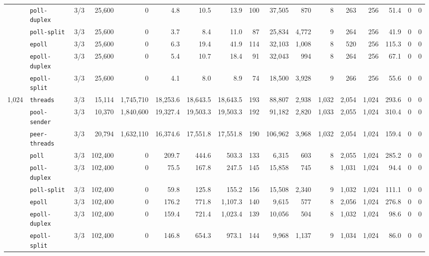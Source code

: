 \begin{longtable}{@{}llrrrrrrrrrrrrrrr@{}}
 & \texttt{poll-duplex} & 3/3 & 25{,}600 & 0 & 4.8 & 10.5 & 13.9 & 100 & 37{,}505 & 870 & 8 & 263 & 256 & 51.4 & 0 & 0 \\
 & \texttt{poll-split} & 3/3 & 25{,}600 & 0 & 3.7 & 8.4 & 11.0 & 87 & 25{,}834 & 4{,}772 & 9 & 264 & 256 & 41.9 & 0 & 0 \\
 & \texttt{epoll} & 3/3 & 25{,}600 & 0 & 6.3 & 19.4 & 41.9 & 114 & 32{,}103 & 1{,}008 & 8 & 520 & 256 & 115.3 & 0 & 0 \\
 & \texttt{epoll-duplex} & 3/3 & 25{,}600 & 0 & 5.4 & 10.7 & 18.4 & 91 & 32{,}043 & 994 & 8 & 264 & 256 & 67.1 & 0 & 0 \\
 & \texttt{epoll-split} & 3/3 & 25{,}600 & 0 & 4.1 & 8.0 & 8.9 & 74 & 18{,}500 & 3{,}928 & 9 & 266 & 256 & 55.6 & 0 & 0 \\
\midrule
1{,}024 & \texttt{threads} & 3/3 & 15{,}114 & 1{,}745{,}710 & 18{,}253.6 & 18{,}643.5 & 18{,}643.5 & 193 & 88{,}807 & 2{,}938 & 1{,}032 & 2{,}054 & 1{,}024 & 293.6 & 0 & 0 \\
 & \texttt{pool-sender} & 3/3 & 10{,}370 & 1{,}840{,}600 & 19{,}327.4 & 19{,}503.3 & 19{,}503.3 & 192 & 91{,}182 & 2{,}820 & 1{,}033 & 2{,}055 & 1{,}024 & 310.4 & 0 & 0 \\
 & \texttt{peer-threads} & 3/3 & 20{,}794 & 1{,}632{,}110 & 16{,}374.6 & 17{,}551.8 & 17{,}551.8 & 190 & 106{,}962 & 3{,}968 & 1{,}032 & 2{,}054 & 1{,}024 & 159.4 & 0 & 0 \\
 & \texttt{poll} & 3/3 & 102{,}400 & 0 & 209.7 & 444.6 & 503.3 & 133 & 6{,}315 & 603 & 8 & 2{,}055 & 1{,}024 & 285.2 & 0 & 0 \\
 & \texttt{poll-duplex} & 3/3 & 102{,}400 & 0 & 75.5 & 167.8 & 247.5 & 145 & 15{,}858 & 745 & 8 & 1{,}031 & 1{,}024 & 94.4 & 0 & 0 \\
 & \texttt{poll-split} & 3/3 & 102{,}400 & 0 & 59.8 & 125.8 & 155.2 & 156 & 15{,}508 & 2{,}340 & 9 & 1{,}032 & 1{,}024 & 111.1 & 0 & 0 \\
 & \texttt{epoll} & 3/3 & 102{,}400 & 0 & 176.2 & 771.8 & 1{,}107.3 & 140 & 9{,}615 & 577 & 8 & 2{,}056 & 1{,}024 & 276.8 & 0 & 0 \\
 & \texttt{epoll-duplex} & 3/3 & 102{,}400 & 0 & 159.4 & 721.4 & 1{,}023.4 & 139 & 10{,}056 & 504 & 8 & 1{,}032 & 1{,}024 & 98.6 & 0 & 0 \\
 & \texttt{epoll-split} & 3/3 & 102{,}400 & 0 & 146.8 & 654.3 & 973.1 & 144 & 9{,}968 & 1{,}137 & 9 & 1{,}034 & 1{,}024 & 86.0 & 0 & 0 \\
\end{longtable}
